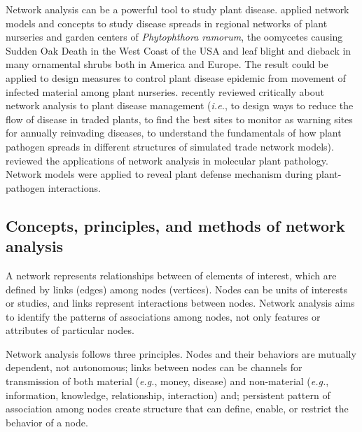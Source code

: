 \documentclass[12pt, oneside]{report}
\begin{document}
Network analysis can be a powerful tool to study plant disease. \citet{Lefebvre:2011fo, Jeger:2007tn} applied network models and concepts to study disease spreads in regional networks of plant nurseries and garden centers of \textit{Phytophthora ramorum}, the oomycetes causing Sudden Oak Death in the West Coast of the USA and leaf blight and dieback in many ornamental shrubs both in America and Europe. The result could be applied to design measures to control plant disease epidemic from movement of infected material among plant nurseries. \citet{Shaw:2014cka} recently reviewed critically about network analysis to plant disease management (\textit{i.e.}, to design ways to reduce the flow of disease in traded plants, to find the best sites to monitor as warning sites for annually reinvading diseases, to understand the fundamentals of how plant pathogen spreads in different structures of simulated trade network models). \citet{windram2014network} reviewed the applications of network analysis in molecular plant pathology. Network models were applied to reveal plant defense mechanism during plant-pathogen interactions.

\subsection*{Concepts, principles, and methods of network analysis}

A network represents relationships between of elements of interest, which are defined by links (edges) among nodes (vertices). Nodes can be units of interests or studies, and links represent interactions between nodes. Network analysis aims to identify the patterns of associations among nodes, not only features or attributes of particular nodes.

Network analysis follows three principles. Nodes and their behaviors are mutually dependent, not autonomous; links between nodes can be channels for transmission of both material (\textit{e.g.}, money, disease) and non-material (\textit{e.g.}, information, knowledge, relationship, interaction) and; persistent pattern of association among nodes create structure that can define, enable, or restrict the behavior of a node.
\end{document}
